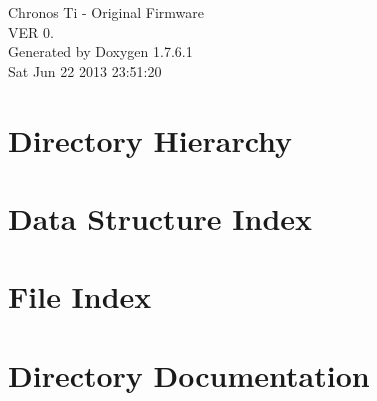 \documentclass[a4paper]{book}
\begin{document}
\hypersetup{pageanchor=false,citecolor=blue}
\begin{titlepage}
\vspace*{7cm}
\begin{center}
{\Large \-Chronos \-Ti -\/ \-Original \-Firmware \\[1ex]\large \-V\-E\-R 0. }\\
\vspace*{1cm}
{\large \-Generated by Doxygen 1.7.6.1}\\
\vspace*{0.5cm}
{\small Sat Jun 22 2013 23:51:20}\\
\end{center}
\end{titlepage}
\clearemptydoublepage
{}
\tableofcontents
\clearemptydoublepage
{}
\hypersetup{pageanchor=true,citecolor=blue}
\chapter{\-Directory \-Hierarchy}

\chapter{\-Data \-Structure \-Index}

\chapter{\-File \-Index}

\chapter{\-Directory \-Documentation}

























\end{document}
